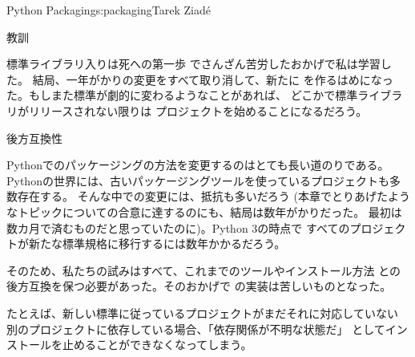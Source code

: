 \begin{aosachapter}{Python Packaging}{s:packaging}{Tarek Ziad\'{e}}
\begin{aosasect1}{教訓}
\begin{aosasect2}{標準ライブラリ入りは死への第一歩}
でさんざん苦労したおかげで私は学習した。
結局、一年がかりの変更をすべて取り消して、新たに
を作るはめになった。もしまた標準が劇的に変わるようなことがあれば、
どこかで標準ライブラリがリリースされない限りは
プロジェクトを始めることになるだろう。

\end{aosasect2}

\begin{aosasect2}{後方互換性}

Pythonでのパッケージングの方法を変更するのはとても長い道のりである。
Pythonの世界には、古いパッケージングツールを使っているプロジェクトも多数存在する。
そんな中での変更には、抵抗も多いだろう
(本章でとりあげたようなトピックについての合意に達するのにも、結局は数年がかりだった。
最初は数カ月で済むものだと思っていたのに)。Python 3の時点で
すべてのプロジェクトが新たな標準規格に移行するには数年かかるだろう。

そのため、私たちの試みはすべて、これまでのツールやインストール方法
との後方互換を保つ必要があった。そのおかげで
の実装は苦しいものとなった。

たとえば、新しい標準に従っているプロジェクトがまだそれに対応していない
別のプロジェクトに依存している場合、「依存関係が不明な状態だ」
としてインストールを止めることができなくなってしまう。


\end{aosasect2}
\end{aosasect1}
\end{aosachapter}
